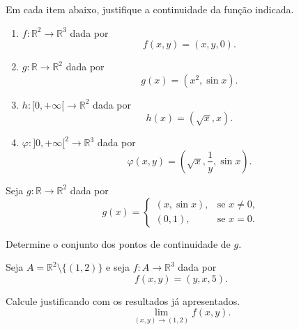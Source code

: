 \begin{exercise}
    Em cada item abaixo, justifique a continuidade da função indicada.

    \begin{enumerate}[label=(\alph*)]
        \item $f:\mathbb R^2\to\mathbb R^3$ dada por
        \[
            f(x,y)=(x,y,0).
        \]

        \item $g:\mathbb R\to\mathbb R^2$ dada por
        \[
            g(x)=(x^2,\sin x).
        \]

        \item $h:[0,+\infty[\to\mathbb R^2$ dada por
        \[
            h(x)=(\sqrt{x},x).
        \]

        \item $\varphi:]0,+\infty[^2\to\mathbb R^3$ dada por
        \[
            \varphi(x,y)=\left(\sqrt{x},\frac{1}{y},\sin x\right).
        \]
    \end{enumerate}
\end{exercise}

\begin{exercise}
    Seja $g:\mathbb R\to\mathbb R^2$ dada por
    \[
        g(x)=
        \begin{cases}
            (x,\sin x), & \text{se } x\neq 0,\\
            (0,1), & \text{se } x=0.
        \end{cases}
    \]

    Determine o conjunto dos pontos de continuidade de $g$.
\end{exercise}

\begin{exercise}
    Seja $A=\mathbb R^2\setminus\{(1,2)\}$ e seja
    $f:A\to\mathbb R^3$ dada por
    \[
        f(x,y)=(y,x,5).
    \]

    Calcule justificando com os resultados já apresentados.
    \[
        \lim_{(x,y)\to(1,2)} f(x,y).
    \]
\end{exercise}